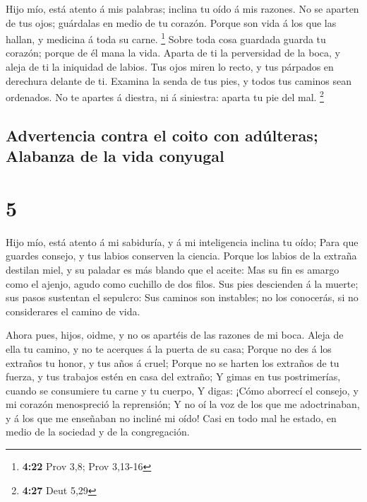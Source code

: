  Hijo mío, está atento á mis palabras; inclina tu oído á
mis razones.  No se aparten de tus ojos; guárdalas en
medio de tu corazón.  Porque son vida á los que las
hallan, y medicina á toda su carne. \footnote{\textbf{4:22} Prov 3,8;
  Prov 3,13-16}  Sobre toda cosa guardada guarda tu
corazón; porque de él mana la vida.  Aparta de ti la
perversidad de la boca, y aleja de ti la iniquidad de labios.
 Tus ojos miren lo recto, y tus párpados en derechura
delante de ti.  Examina la senda de tus pies, y todos tus
caminos sean ordenados.  No te apartes á diestra, ni á
siniestra: aparta tu pie del mal. \footnote{\textbf{4:27} Deut 5,29}

\hypertarget{advertencia-contra-el-coito-con-aduxfalteras-alabanza-de-la-vida-conyugal}{%
\subsection{Advertencia contra el coito con adúlteras; Alabanza de la
vida
conyugal}\label{advertencia-contra-el-coito-con-aduxfalteras-alabanza-de-la-vida-conyugal}}

\hypertarget{section-4}{%
\section{5}\label{section-4}}

 Hijo mío, está atento á mi sabiduría, y á mi inteligencia
inclina tu oído;  Para que guardes consejo, y tus labios
conserven la ciencia.  Porque los labios de la extraña
destilan miel, y su paladar es más blando que el aceite: 
Mas su fin es amargo como el ajenjo, agudo como cuchillo de dos filos.
 Sus pies descienden á la muerte; sus pasos sustentan el
sepulcro:  Sus caminos son instables; no los conocerás, si
no considerares el camino de vida.

 Ahora pues, hijos, oidme, y no os apartéis de las razones
de mi boca.  Aleja de ella tu camino, y no te acerques á
la puerta de su casa;  Porque no des á los extraños tu
honor, y tus años á cruel;  Porque no se harten los
extraños de tu fuerza, y tus trabajos estén en casa del extraño;
 Y gimas en tus postrimerías, cuando se consumiere tu
carne y tu cuerpo,  Y digas: ¡Cómo aborrecí el consejo, y
mi corazón menospreció la reprensión;  Y no oí la voz de
los que me adoctrinaban, y á los que me enseñaban no incliné mi oído!
 Casi en todo mal he estado, en medio de la sociedad y de
la congregación.

